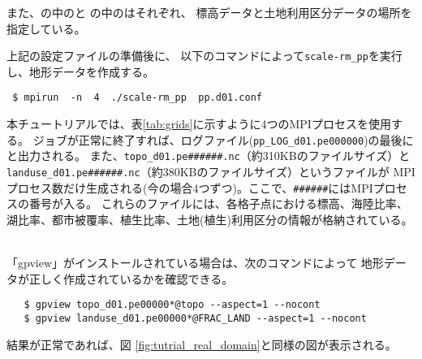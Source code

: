 また、の中のと
の中のはそれぞれ、
標高データと土地利用区分データの場所を指定している。


上記の設定ファイルの準備後に、
以下のコマンドによって\verb|scale-rm_pp|を実行し、地形データを作成する。
\begin{verbatim}
 $ mpirun  -n  4  ./scale-rm_pp  pp.d01.conf
\end{verbatim}
本チュートリアルでは、表\ref{tab:grids}に示すように4つのMPIプロセスを使用する。
ジョブが正常に終了すれば、ログファイル(\verb|pp_LOG_d01.pe000000|)の最後に
と出力される。
また、\verb|topo_d01.pe######.nc|（約310KBのファイルサイズ）と\\
\verb|landuse_d01.pe######.nc|（約380KBのファイルサイズ）というファイルが
MPIプロセス数だけ生成される(今の場合4つずつ)。ここで、\verb|######|にはMPIプロセスの番号が入る。
これらのファイルには、各格子点における標高、海陸比率、湖比率、都市被覆率、植生比率、土地(植生)利用区分の情報が格納されている。


 \vspace{1cm}
  \hrulefill \\
 「gpview」がインストールされている場合は、次のコマンドによって
 地形データが正しく作成されているかを確認できる。
 \begin{verbatim}
   $ gpview topo_d01.pe00000*@topo --aspect=1 --nocont
   $ gpview landuse_d01.pe00000*@FRAC_LAND --aspect=1 --nocont
 \end{verbatim}
 結果が正常であれば、図 \ref{fig:tutrial_real_domain}と同様の図が表示される。
